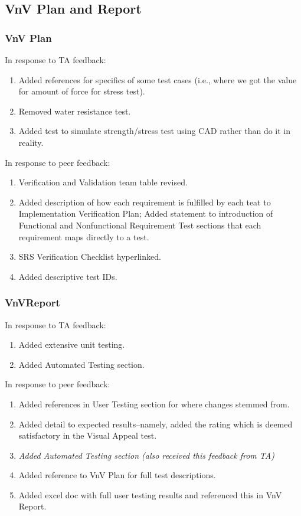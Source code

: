 \documentclass{article}
\begin{document}
\subsection{VnV Plan and Report}

\subsubsection{VnV Plan}
In response to TA feedback:
\begin{enumerate}
    \item Added references for specifics of some test cases (i.e., where we got the value for amount of force for stress test).
    \item Removed water resistance test.
    \item Added test to simulate strength/stress test using CAD rather than do it in reality.
\end{enumerate}

\noindent In response to peer feedback:
\begin{enumerate}
    \item Verification and Validation team table revised.
    \item Added description of how each requirement is fulfilled by each teat to Implementation Verification Plan; Added statement to introduction of Functional and Nonfunctional Requirement Test sections that each requirement maps directly to a test.
    \item SRS Verification Checklist hyperlinked.
    \item Added descriptive test IDs.
\end{enumerate}

\subsubsection{VnVReport}
In response to TA feedback:
\begin{enumerate}
    \item Added extensive unit testing.
    \item Added Automated Testing section.
\end{enumerate}

\noindent In response to peer feedback:
\begin{enumerate}
    \item Added references in User Testing section for where changes stemmed from.
    \item Added detail to expected results--namely, added the rating which is deemed satisfactory in the Visual Appeal test.
    \item \textit{Added Automated Testing section (also received this feedback from TA)}
    \item Added reference to VnV Plan for full test descriptions.
    \item Added excel doc with full user testing results and referenced this in VnV Report. 
\end{enumerate}
\end{document}
